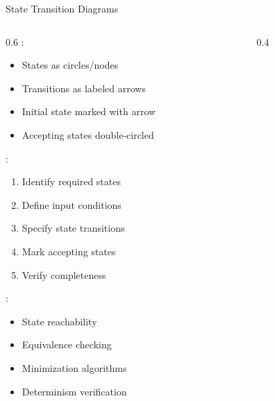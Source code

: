 \begin{frame}{State Transition Diagrams}
\begin{columns}
\begin{column}{0.6\textwidth}
:
\begin{itemize}
\item States as circles/nodes
\item Transitions as labeled arrows
\item Initial state marked with arrow
\item Accepting states double-circled
\end{itemize}
\vspace{0.3cm}
:
\begin{enumerate}
\item Identify required states
\item Define input conditions
\item Specify state transitions
\item Mark accepting states
\item Verify completeness
\end{enumerate}
\vspace{0.3cm}
:
\begin{itemize}
\item State reachability
\item Equivalence checking
\item Minimization algorithms
\item Determinism verification
\end{itemize}
\end{column}
\begin{column}{0.4\textwidth}
\begin{center}

\end{center}
\end{column}
\end{columns}
\end{frame}

